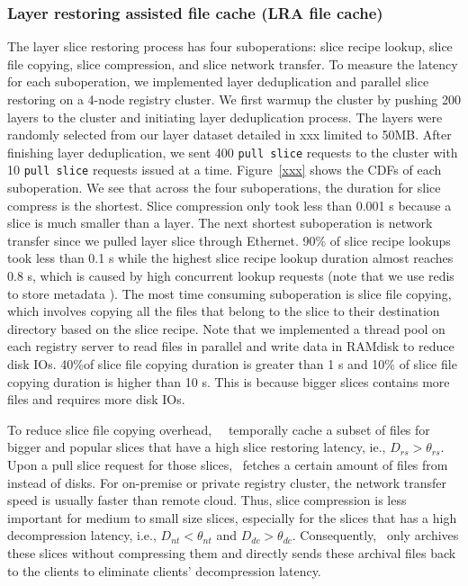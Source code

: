 \subsubsection{Layer restoring assisted file cache (LRA file cache)}

The layer slice restoring process has four suboperations: 
slice recipe lookup,
slice file copying,
slice compression, and
slice network transfer. 
To measure the latency for each suboperation, we implemented layer deduplication and parallel slice
restoring on a 4-node registry cluster. 
We first warmup the cluster by pushing 200 layers to the cluster
and initiating layer deduplication process.
The layers were randomly selected from our layer dataset detailed in xxx limited to 50MB.
After finishing layer deduplication,
we sent 400 \texttt{pull slice} requests to the cluster with 10 \texttt{pull slice} requests issued at a time.
Figure~\ref{xxx} shows the CDFs of each suboperation.
We see that across the four suboperations,
the duration for slice compress is the shortest.
Slice compression only took less than 0.001 s because a slice is much smaller than a layer. 
The next shortest suboperation is network transfer since we pulled layer slice through Ethernet.
90\% of slice recipe lookups took less than 0.1 s while 
the highest slice recipe lookup duration almost reaches 0.8 s,
which is caused by high concurrent lookup requests 
(note that we use redis to store metadata ).
The most time consuming suboperation is slice file copying, which involves 
copying all 
the files that belong to the slice to their destination directory based on the slice recipe.
Note that we implemented a thread pool on each registry server to read files in parallel
and write data in RAMdisk to reduce disk IOs.
40\%of slice file copying duration is greater than 1 s and 
10\% of slice file copying duration is higher than 10 s.
This is because bigger slices contains more files and requires more disk IOs.

To reduce slice file copying overhead,
\sysname~\filecachename~temporally cache a subset of files for bigger and popular slices that have a high slice restoring latency, ie., $D_{rs} > \theta_{rs}$. 
Upon a pull slice request for those slices, 
\dedupname~fetches a certain amount of files from \filecachename~
instead of disks.
For on-premise or private registry cluster, the network transfer speed is usually faster than remote cloud.
Thus, slice compression is less important for medium to small size slices, 
especially for the slices that has a high decompression latency, 
i.e., $D_{nt} < \theta_{nt}$ and $D_{dc} > \theta_{dc}$. 
Consequently, \dedupname~only archives these slices without compressing them and directly sends
these archival files back to the clients to eliminate clients' decompression latency.

